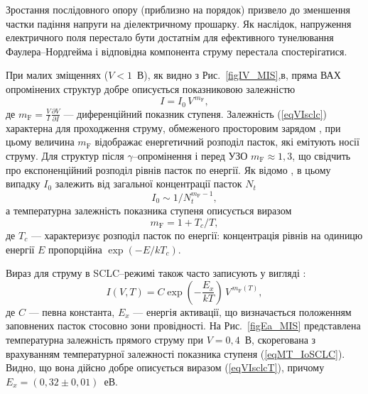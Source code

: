 Зростання послідовного опору (приблизно на порядок) призвело до зменшення частки падіння напруги на діелектричному прошарку.
Як наслідок, напруження електричного поля перестало бути достатнім для ефективного тунелювання Фаулера--Нордгейма і відповідна компонента струму перестала спостерігатися.

При малих зміщеннях ($V<1$~В), як видно з Рис.~\ref{figIV_MIS},в, пряма ВАХ опромінених структур добре описується показниковою залежністю
\begin{equation}\label{eqVIsclc}
  I=I_0\,V^{\,m_\mathrm{F}},
\end{equation}
де $m_\mathrm{F}=\frac{V}{I}\frac{\partial V}{\partial I}$ --- диференційний показник ступеня.
Залежність (\ref{eqVIsclc}) характерна для проходження струму, обмеженого просторовим зарядом \cite{SCLC:MA2016,Jafar,SCLC:Kaya}, при цьому величина $m_\mathrm{F}$ відображає енергетичний розподіл пасток, які емітують носії струму.
Для структур після $\gamma$--опромінення і перед УЗО $m_\mathrm{F}\approx1,3$, що свідчить про експоненційний розподіл рівнів пасток по енергії.
Як відомо \cite{SCLC:MA2016,Jafar,SCLC:Kaya}, в цьому випадку $I_0$ залежить від загальної концентрації пасток $N_t$
\begin{equation}\label{eqIoSCLC}
  I_0\sim 1/N_t^{m_\mathrm{F}-1},
\end{equation}
а температурна залежність показника ступеня описується виразом
\begin{equation}\label{eqMT_IoSCLC}
  m_\mathrm{F}=1+T_c/T,
\end{equation}
де
$T_c$ --- характеризує розподіл пасток по енергії:
концентрація рівнів на одиницю енергії $E$ пропорційна $\exp(-E/kT_c)$.

Вираз для струму в SCLC--режимі також часто записують у вигляді \cite{Jafar}:
\begin{equation}\label{eqVIsclcT}
  I(V,T)=C\exp\left(-\frac{E_x}{kT}\right)\,V^{\,m_\mathrm{F}(T)},
\end{equation}
де
$C$ --- певна константа,
$E_x$ --- енергія активації, що визначається положенням заповнених пасток стосовно зони провідності.
На Рис.~\ref{figEa_MIS} представлена температурна залежність прямого струму при $V=0,4$~В, скорегована з врахуванням
температурної залежності показника ступеня (\ref{eqMT_IoSCLC}).
Видно, що вона дійсно добре описується виразом (\ref{eqVIsclcT}), причому $E_x=(0,32\pm0,01)$~еВ.

